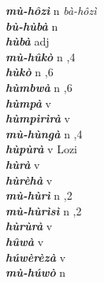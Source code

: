 \begin{multicols}{2}
{{\bfseries\itshape mù-hôzì}} \relax  n   \relax  \textit{bà-hôzì} \relax  \\
{{\bfseries\itshape bù-hùbà}} \relax  n   \relax  {} \relax   \relax  \\
{{\bfseries\itshape hùbà}} \relax  adj  \relax   \relax  {} \relax   \relax  \\
{{\bfseries\itshape mù-hûkò}} \relax  n  ,4  \relax   \relax  \\
{{\bfseries\itshape hùkò}} \relax  n  ,6  \relax   \relax  \\
{{\bfseries\itshape hùmbwà}} \relax  n  ,6  \relax   \relax  \\
{{\bfseries\itshape hùmpà}} \relax  v  \relax   \relax  {} \relax   \relax  \\
{{\bfseries\itshape hùmpìrìrà}} \relax  v  \relax   \relax  {} \relax   \relax  \\
{{\bfseries\itshape mù-hùngà}} \relax  n  ,4  \relax   \relax  \\
{{\bfseries\itshape hùpùrà}} \relax  v  \relax   \relax  {} \relax  Lozi \relax  \\
{{\bfseries\itshape hùrà}} \relax  v  \relax   \relax  {} \relax   \relax  \\
{{\bfseries\itshape hùrèhà}} \relax  v  \relax   \relax  {} \relax   \relax  \\
{{\bfseries\itshape mù-hùrì}} \relax  n  ,2  \relax   \relax  \\
{{\bfseries\itshape mù-hùrìsì}} \relax  n  ,2  \relax   \relax  \\
{{\bfseries\itshape hùrùrà}} \relax  v  \relax   \relax  {} \relax   \relax  \\
{{\bfseries\itshape hûwà}} \relax  v  \relax   \relax  {} \relax   \relax  \\
{{\bfseries\itshape húwèrèzà}} \relax  v  \relax   \relax  {} \relax   \relax  \\
{{\bfseries\itshape mù-húwò}} \relax  n   \relax  {} \relax   \relax  \\

\end{multicols}
